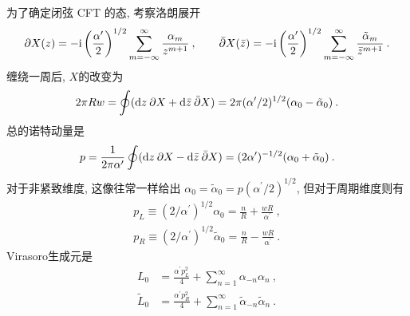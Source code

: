 为了确定闭弦 CFT 的态, 考察洛朗展开
\begin{equation}
	\partial X(z)=-\mathrm{i}\left(\frac{\alpha^{\prime}}{2}\right)^{1 / 2} \sum_{m=-\infty}^{\infty} \frac{\alpha_{m}}{z^{m+1}}\:, \qquad 
	\bar{\partial} X(\bar{z})=-\mathrm{i}\left(\frac{\alpha^{\prime}}{2}\right)^{1 / 2} \sum_{m=-\infty}^{\infty} \frac{\tilde{\alpha}_{m}}{\bar{z}^{m+1}} \:. \label{8.2.4}
\end{equation}
缠绕一周后, $X$的改变为
\begin{equation}
	2 \pi R w=\oint(\mathrm{d} z\: \partial X + \mathrm{d} \bar{z}\: \bar{\partial} X)= 2 \pi(\alpha^{\prime}/2)^{1/2}(\alpha_{0}-\tilde{\alpha}_{0}) \:. \label{8.2.5}
\end{equation}
总的诺特动量是
\begin{equation}
	p=\frac{1}{2 \pi \alpha^{\prime}} \oint(\mathrm{d} z\: \partial X- \mathrm{d} \bar{z}\: \bar{\partial} X)
	=(2 \alpha^{\prime})^{-1 / 2}(\alpha_{0}+\tilde{\alpha}_{0}) \:. \label{8.2.6}
\end{equation}
对于非紧致维度, 这像往常一样给出 $\alpha_{0}=\tilde{\alpha}_{0}=p(\alpha^{\prime} / 2)^{1 / 2}$, 但对于周期维度则有
\begin{subequations} \label{8.2.7}
\begin{align}
p_{L} \equiv\left(2 / \alpha^{\prime}\right)^{1 / 2} \alpha_{0}=\frac{n}{R}+\frac{w R}{\alpha^{\prime}} \:, \label{8.2.7a} \\
p_{R} \equiv\left(2 / \alpha^{\prime}\right)^{1 / 2} \tilde{\alpha}_{0}=\frac{n}{R}-\frac{w R}{\alpha^{\prime}} \:. \label{8.2.7b}
\end{align}		
\end{subequations}
Virasoro生成元是
\begin{subequations} \label{8.2.8}
\begin{align}
L_{0}&=\frac{\alpha^{\prime} p_{L}^{2}}{4}+\sum_{n=1}^{\infty} \alpha_{-n} \alpha_{n} \:, \label{8.2.8a} \\
\tilde{L}_{0}&=\frac{\alpha^{\prime} p_{R}^{2}}{4}+\sum_{n=1}^{\infty} \tilde{\alpha}_{-n} \tilde{\alpha}_{n} \:. \label{8.2.8b}
\end{align}		 				
\end{subequations}


